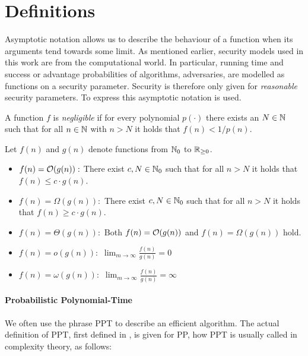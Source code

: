 \section{Definitions}
Asymptotic notation allows us to describe the behaviour of a function when its arguments tend towards some limit.
As mentioned earlier, security models used in this work are from the computational world.
In particular, running time and success or advantage probabilities of algorithms, \ie adversaries, are modelled as functions on a security parameter.
Security is therefore only given for \emph{reasonable} security parameters.
To express this asymptotic notation is used.

\begin{definition}\label{def:negligible}
A function $f$ is \emph{negligible} if for every polynomial $p(\cdot)$ there exists an $N\in\mathbb{N}$ such that for all $n\in\mathbb{N}$ with $n>N$ it holds that $f(n)<1/p(n)$.
\eod
\end{definition}

\begin{definition}\label{def:asymptotic}
Let $f(n)$ and $g(n)$ denote functions from $\mathbb{N}_0$ to $\mathbb{R}_{\geq 0}$.
\begin{itemize}
	\item $f(n)=\mathcal{O}(g(n)):$ There exist $c,N\in\mathbb{N}_0$ such that for all $n>N$ it holds that $f(n)\leq c\cdot g(n)$.
	\item $f(n)=\Omega(g(n)):$ There exist $c,N\in\mathbb{N}_0$ such that for all $n>N$ it holds that $f(n)\geq c\cdot g(n)$.
	\item $f(n)=\Theta(g(n)):$ Both $f(n)=\mathcal{O}(g(n))$ and $f(n)=\Omega(g(n))$ hold.
	\item $f(n)=o(g(n)):$ $\lim_{m\rightarrow\infty}\frac{f(n)}{g(n)}=0$
	\item $f(n)=\omega(g(n)):$ $\lim_{m\rightarrow\infty}\frac{f(n)}{g(n)}=\infty$ 
	\eod
\end{itemize}
\end{definition}

\paragraph{Probabilistic Polynomial-Time}
We often use the phrase \ac{PPT} to describe an efficient algorithm.
The actual definition of \ac{PPT}, first defined in \cite{gill1977}, is given for \ac{PP}, how \ac{PPT} is usually called in complexity theory, as follows:

